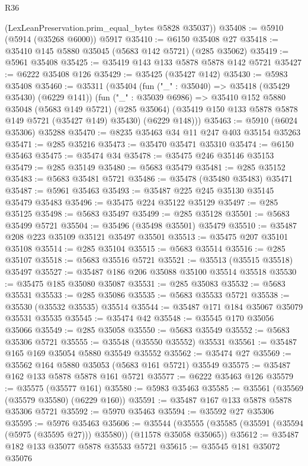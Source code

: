 \begin{lexlean}{R36}
\begin{coremodule}
      (LexLeanPreservation.prim_equal_bytes @5828 @35037))
@35408 := @5910 (@5914 (@35268 @6000)) @5917
@35410 := @6150 @35408 @27
@35418 := @35410 @145 @5880 @35045 (@5683 @142 @5721) (@285 @35062)
@35419 := @5961 @35408
@35425 := @35419 @143 @133 @5878 @5878 @142 @5721
@35427 := @6222 @35408 @126
@35429 := @35425 (@35427 @142)
@35430 := @5983 @35408
@35460 := @35311
    (@35404
      (fun ("_" : @35040) => @35418 (@35429 @35430) (@6229 @141))
      (fun ("_" : @35039 @6986) =>
      @35410
        @152
        @5880
        @35048
        (@5683 @149 @5721)
        (@285 @35064)
        (@35419 @150 @133 @5878 @5878 @149 @5721 (@35427 @149) @35430)
        (@6229 @148)))
@35463 := @5910 (@6024 @35306) @35288
@35470 := @8235 @35463 @34 @11 @247 @403 @35154 @35263
@35471 := @285 @35216
@35473 := @35470 @35471 @35310
@35474 := @6150 @35463
@35475 := @35474 @34
@35478 := @35475 @246 @35146 @35153
@35479 := @285 @35149
@35480 := @5683 @35479
@35481 := @285 @35152
@35483 := @5683 @35481 @5721
@35486 := @35478 (@35480 @35483) @35471
@35487 := @5961 @35463
@35493 := @35487 @225 @245 @35130 @35145 @35479 @35483
@35496 := @35475 @224 @35122 @35129
@35497 := @285 @35125
@35498 := @5683 @35497
@35499 := @285 @35128
@35501 := @5683 @35499 @5721
@35504 := @35496 (@35498 @35501) @35479
@35510 := @35487 @208 @223 @35109 @35121 @35497 @35501
@35513 := @35475 @207 @35101 @35108
@35514 := @285 @35104
@35515 := @5683 @35514
@35516 := @285 @35107
@35518 := @5683 @35516 @5721
@35521 := @35513 (@35515 @35518) @35497
@35527 := @35487 @186 @206 @35088 @35100 @35514 @35518
@35530 := @35475 @185 @35080 @35087
@35531 := @285 @35083
@35532 := @5683 @35531
@35533 := @285 @35086
@35535 := @5683 @35533 @5721
@35538 := @35530 (@35532 @35535) @35514
@35544 := @35487 @171 @184 @35067 @35079 @35531 @35535
@35545 := @35474 @42
@35548 := @35545 @170 @35056 @35066
@35549 := @285 @35058
@35550 := @5683 @35549
@35552 := @5683 @35306 @5721
@35555 := @35548 (@35550 @35552) @35531
@35561 := @35487 @165 @169 @35054 @5880 @35549 @35552
@35562 := @35474 @27
@35569 := @35562 @164 @5880 @35053 (@5683 @161 @5721) @35549
@35575 := @35487 @162 @133 @5878 @5878 @161 @5721
@35577 := @6222 @35463 @126
@35579 := @35575 (@35577 @161)
@35580 := @5983 @35463
@35585 := @35561 (@35569 (@35579 @35580) (@6229 @160))
@35591 := @35487 @167 @133 @5878 @5878 @35306 @5721
@35592 := @5970 @35463
@35594 := @35592 @27 @35306
@35595 := @5976 @35463
@35606 := @35544
    (@35555 (@35585 (@35591 (@35594 (@5975 (@35595 @27))) @35580)) (@11578 @35058 @35065))
@35612 := @35487 @182 @133 @35077 @5878 @35533 @5721
@35615 := @35545 @181 @35072 @35076

\end{coremodule}
\end{lexlean}
